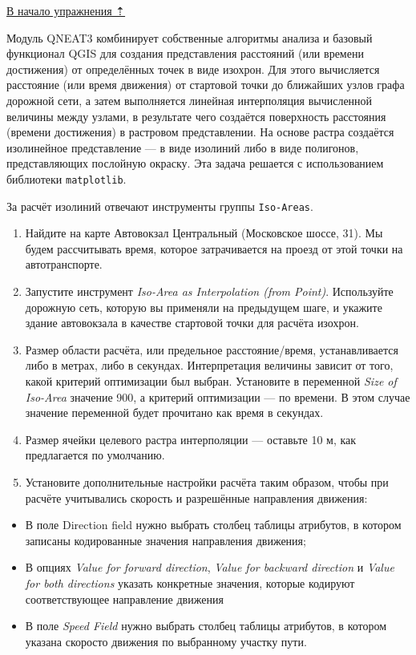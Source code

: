\documentclass[
  12pt,
]{book}
\providecommand{\tightlist}{%
  \setlength{\itemsep}{0pt}\setlength{\parskip}{0pt}}
\begin{document}
\protect\hyperlink{networks}{В начало упражнения ⇡}

Модуль QNEAT3 комбинирует собственные алгоритмы анализа и базовый функционал QGIS для создания представления расстояний (или времени достижения) от определённых точек в виде изохрон. Для этого вычисляется расстояние (или время движения) от стартовой точки до ближайших узлов графа дорожной сети, а затем выполняется линейная интерполяция вычисленной величины между узлами, в результате чего создаётся поверхность расстояния (времени достижения) в растровом представлении. На основе растра создаётся изолинейное представление --- в виде изолиний либо в виде полигонов, представляющих послойную окраску. Эта задача решается с использованием библиотеки \texttt{matplotlib}.

За расчёт изолиний отвечают инструменты группы \texttt{Iso-Areas}.

\begin{enumerate}
\def\labelenumi{\arabic{enumi}.}
\item
  Найдите на карте Автовокзал Центральный (Московское шоссе, 31). Мы будем рассчитывать время, которое затрачивается на проезд от этой точки на автотранспорте.
\item
  Запустите инструмент \emph{Iso-Area as Interpolation (from Point)}. Используйте дорожную сеть, которую вы применяли на предыдущем шаге, и укажите здание автовокзала в качестве стартовой точки для расчёта изохрон.
\item
  Размер области расчёта, или предельное расстояние/время, устанавливается либо в метрах, либо в секундах. Интерпретация величины зависит от того, какой критерий оптимизации был выбран. Установите в переменной \emph{Size of Iso-Area} значение 900, а критерий оптимизации --- по времени. В этом случае значение переменной будет прочитано как время в секундах.
\item
  Размер ячейки целевого растра интерполяции --- оставьте 10 м, как предлагается по умолчанию.
\item
  Установите дополнительные настройки расчёта таким образом, чтобы при расчёте учитывались скорость и разрешённые направления движения:
\end{enumerate}

\begin{itemize}
\tightlist
\item
  В поле Direction field нужно выбрать столбец таблицы атрибутов, в котором записаны кодированные значения направления движения;
\item
  В опциях \emph{Value for forward direction}, \emph{Value for backward direction} и \emph{Value for both directions} указать конкретные значения, которые кодируют соответствующее направление движения
\item
  В поле \emph{Speed Field} нужно выбрать столбец таблицы атрибутов, в котором указана скоросто движения по выбранному участку пути.
\end{itemize}
\end{document}
